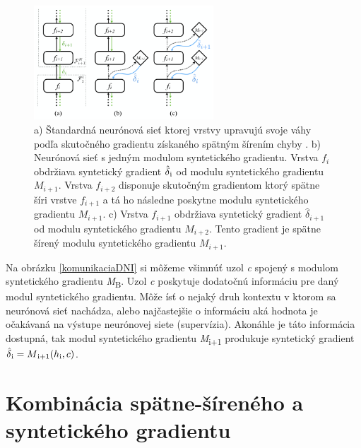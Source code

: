 \begin{figure}
\centerline{\includegraphics[width=0.6\textwidth]{images/multiDNI}}
\caption[Porovnanie architektúr neurónových sieti s implementáciou DNI]{a) Štandardná neurónová sieť ktorej vrstvy upravujú svoje váhy podľa skutočného gradientu získaného spätným šírením chyby \cite{Goh1995}. b) Neurónová sieť s jedným modulom syntetického gradientu. Vrstva $f_i$ obdržiava syntetický gradient $\hat{\delta}\textsubscript{i}$ od modulu syntetického gradientu $M_{i+1}$. Vrstva $f_{i+2}$ disponuje skutočným gradientom ktorý spätne šíri vrstve $f_{i+1}$ a tá ho následne poskytne modulu syntetického gradientu $M_{i+1}$. c) Vrstva $f_{i+1}$ obdržiava syntetický gradient $\hat{\delta}_{i+1}$ od modulu syntetického gradientu $M_{i+2}$. Tento gradient je spätne šírený modulu syntetického gradientu $M_{i+1}$. \cite{Jaderberg2016}}
\label{multiDNI}
\end{figure}

Na obrázku \ref{komunikaciaDNI} si môžeme všimnúť uzol \textit{c} spojený s modulom syntetického gradientu \textit{M}\textsubscript{B}. Uzol \textit{c} poskytuje dodatočnú informáciu pre daný modul syntetického gradientu. Môže ísť o nejaký druh kontextu v ktorom sa neurónová sieť nachádza, alebo najčastejšie o informáciu aká hodnota je očakávaná na výstupe neurónovej siete (supervízia). Akonáhle je táto informácia dostupná, tak modul syntetického gradientu \textit{M}\textsubscript{i+1} produkuje syntetický gradient $\hat{\delta}\textsubscript{i} = M\textsubscript{i+1}(h\textsubscript{i},c)$.

\section{Kombinácia spätne-šíreného a syntetického gradientu}

